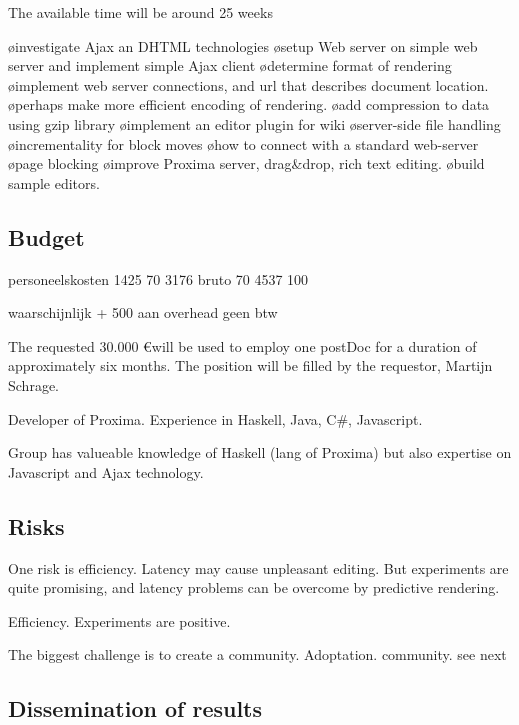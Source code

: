 The available time will be around 25 weeks

\bl
\o investigate Ajax an DHTML technologies
\o setup Web server on simple web server and implement simple Ajax client
\o determine format of rendering
\o implement web server connections, and url that describes document location.
\o perhaps make more efficient encoding of rendering.
\o add compression to data using gzip library
\o implement an editor plugin for wiki
\o server-side file handling
\o incrementality for block moves
\o how to connect with a standard web-server
\o page blocking
\o improve Proxima server, drag&drop, rich text editing.
\o build sample editors.
\el

\subsection{Budget}

\bc
personeelskosten
1425       70%
3176 bruto 70%
4537       100%

waarschijnlijk + 500 aan overhead
geen btw

\ec

The requested 30.000 \euro will be used to employ one postDoc for a duration of approximately six months. The position will be filled by the requestor, Martijn Schrage.

Developer of Proxima. Experience in Haskell, Java, C#, Javascript.

Group has valueable knowledge of Haskell (lang of Proxima) but also expertise on Javascript and Ajax technology.
\subsection{Risks}

One risk is efficiency. Latency may cause unpleasant editing. But experiments are quite promising, and latency problems can be overcome by predictive rendering. 

Efficiency. Experiments are positive.

The biggest challenge is to create a community. Adoptation. community. see next


\subsection{Dissemination of results}

